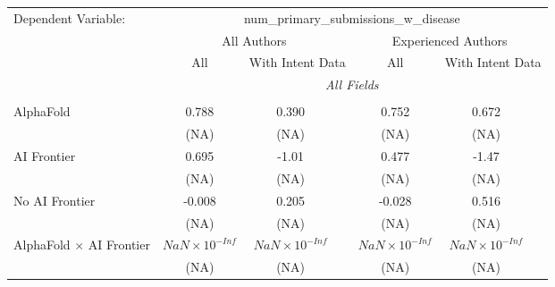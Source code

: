 \begingroup
\centering
\begin{tabular}{lcccccc}
   \tabularnewline \midrule \midrule
   Dependent Variable: & \multicolumn{6}{c}{num\_primary\_submissions\_w\_disease}\\
 & \multicolumn{3}{c}{All Authors} & \multicolumn{3}{c}{Experienced Authors} \\
\cmidrule(lr){2-4} \cmidrule(lr){5-7}
 & \multicolumn{1}{c}{All} & \multicolumn{2}{c}{With Intent Data} & \multicolumn{1}{c}{All} & \multicolumn{2}{c}{With Intent Data} \\
\cmidrule(lr){2-2} \cmidrule(lr){3-4} \cmidrule(lr){5-5} \cmidrule(lr){6-7}
 & \multicolumn{6}{c}{\textit{All Fields}} \\ \\
   AlphaFold                                                                  & 0.788                  & 0.390                  &                        & 0.752                  & 0.672                  &   \\   
                                                                              & (NA)                   & (NA)                   &                        & (NA)                   & (NA)                   &   \\   
   AI Frontier                                                                & 0.695                  & -1.01                  &                        & 0.477                  & -1.47                  &   \\   
                                                                              & (NA)                   & (NA)                   &                        & (NA)                   & (NA)                   &   \\   
   No AI Frontier                                                             & -0.008                 & 0.205                  &                        & -0.028                 & 0.516                  &   \\   
                                                                              & (NA)                   & (NA)                   &                        & (NA)                   & (NA)                   &   \\   
   AlphaFold $\times$ AI Frontier                                             & $NaN\times 10^{-Inf}$  & $NaN\times 10^{-Inf}$  &                        & $NaN\times 10^{-Inf}$  & $NaN\times 10^{-Inf}$  &   \\   
                                                                              & (NA)                   & (NA)                   &                        & (NA)                   & (NA)                   &   \\   

\end{tabular}
